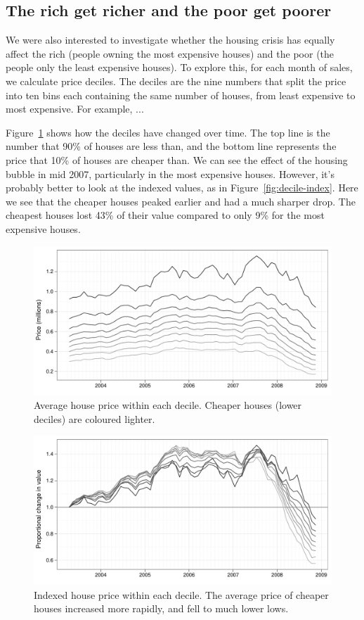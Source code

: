 \documentclass[oneside]{article}
\begin{document}
\subsection{The rich get richer and the poor get poorer}

We were also interested to investigate whether the housing crisis has equally affect the rich (people owning the most expensive houses) and the poor (the people only the least expensive houses).  To explore this, for each month of sales, we calculate price deciles.  The deciles are the nine numbers that split the price into ten bins each containing the same number of houses,  from least expensive to most expensive.  For example, ...

Figure~\ref{fig:decile-raw} shows how the deciles have changed over time.  The top line is the number that 90\% of houses are less than, and the bottom line represents the price that 10\% of houses are cheaper than.  We can see the effect of the housing bubble in mid 2007, particularly in the most expensive houses.  However, it's probably better to look at the indexed values, as in Figure~\ref{fig:decile-index}.  Here we see that the cheaper houses peaked earlier and had a much sharper drop.  The cheapest houses lost 43\% of their value compared to only 9\% for the most expensive houses.

\begin{figure}[htbp]
  \centering
  \includegraphics[width=0.75\linewidth]{decile-raw}
  \caption{Average house price within each decile.  Cheaper houses (lower deciles) are coloured lighter.} 
  \label{fig:decile-raw}
\end{figure}

\begin{figure}[htbp]
  \centering
  \includegraphics[width=0.75\linewidth]{decile-ind}
  \caption{Indexed house price within each decile.  The average price of cheaper houses increased more rapidly, and fell to much lower lows.}
  \label{fig:decile-ind}
\end{figure}
\end{document}
